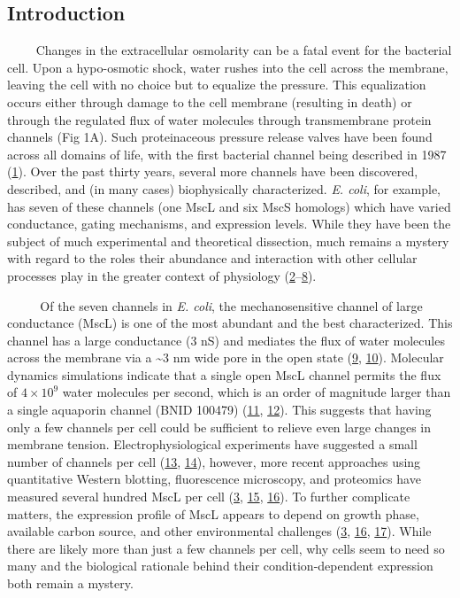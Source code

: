 \subsection{Introduction}\label{introduction}

~~~~
Changes
in the
extracellular
osmolarity
can be
a
fatal
event
for
the
bacterial
cell.
Upon a
hypo-osmotic
shock,
water
rushes
into
the
cell
across
the
membrane,
leaving
the
cell
with
no
choice
but to
equalize
the
pressure.
This
equalization
occurs
either
through
damage
to the
cell
membrane
(resulting
in
death)
or
through
the
regulated
flux
of
water
molecules
through
transmembrane
protein
channels
(Fig
1A).
Such
proteinaceous
pressure
release
valves
have
been
found
across
all
domains
of
life,
with
the
first
bacterial
channel
being
described
in
1987
(\protect\hyperlink{ref-martinac1987}{1}).
Over
the
past
thirty
years,
several
more
channels
have
been
discovered,
described,
and
(in
many
cases)
biophysically
characterized.
\emph{E.
coli},
for
example,
has
seven
of
these
channels
(one
MscL
and
six
MscS
homologs)
which
have
varied
conductance,
gating
mechanisms,
and
expression
levels.
While
they
have
been
the
subject
of
much
experimental
and
theoretical
dissection,
much
remains
a
mystery
with
regard
to the
roles
their
abundance
and
interaction
with
other
cellular
processes
play
in the
greater
context
of
physiology
(\protect\hyperlink{ref-bavi2016}{2}--\protect\hyperlink{ref-vandenberg2016}{8}).

~~ ~
~Of
the
seven
channels
in
\emph{E.
coli},
the
mechanosensitive
channel
of
large
conductance
(MscL)
is one
of the
most
abundant
and
the
best
characterized.
This
channel
has a
large
conductance
(3 nS)
and
mediates
the
flux
of
water
molecules
across
the
membrane
via a
\textasciitilde{}3
nm
wide
pore
in the
open
state
(\protect\hyperlink{ref-cruickshank1997}{9},
\protect\hyperlink{ref-haswell2011}{10}).
Molecular
dynamics
simulations
indicate
that a
single
open
MscL
channel
permits
the
flux
of
\(4 \times 10^9\)
water
molecules
per
second,
which
is an
order
of
magnitude
larger
than a
single
aquaporin
channel
(BNID
100479)
(\protect\hyperlink{ref-louhivuori2010}{11},
\protect\hyperlink{ref-milo2010}{12}).
This
suggests
that
having
only a
few
channels
per
cell
could
be
sufficient
to
relieve
even
large
changes
in
membrane
tension.
Electrophysiological
experiments
have
suggested
a
small
number
of
channels
per
cell
(\protect\hyperlink{ref-booth2005}{13},
\protect\hyperlink{ref-hase1997}{14}),
however,
more
recent
approaches
using
quantitative
Western
blotting,
fluorescence
microscopy,
and
proteomics
have
measured
several
hundred
MscL
per
cell
(\protect\hyperlink{ref-bialecka-fornal2012}{3},
\protect\hyperlink{ref-schmidt2016}{15},
\protect\hyperlink{ref-soufi2015}{16}).
To
further
complicate
matters,
the
expression
profile
of
MscL
appears
to
depend
on
growth
phase,
available
carbon
source,
and
other
environmental
challenges
(\protect\hyperlink{ref-bialecka-fornal2012}{3},
\protect\hyperlink{ref-soufi2015}{16},
\protect\hyperlink{ref-stokes2003a}{17}).
While
there
are
likely
more
than
just a
few
channels
per
cell,
why
cells
seem
to
need
so
many
and
the
biological
rationale
behind
their
condition-dependent
expression
both
remain
a
mystery.


